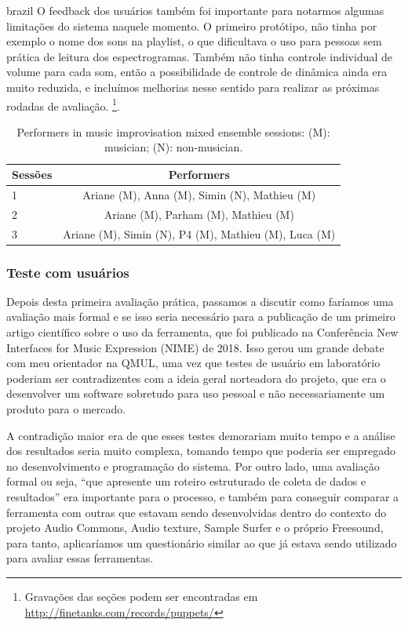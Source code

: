 \begin{otherlanguage*}{brazil}
O feedback dos usuários também foi importante para notarmos algumas limitações do sistema naquele momento. O primeiro protótipo, não tinha por exemplo o nome dos sons na playlist, o que dificultava o uso para pessoas sem prática de leitura dos espectrogramas. Também não tinha controle individual de volume para cada som, então a possibilidade de controle de dinâmica ainda era muito reduzida, e incluímos melhorias nesse sentido para realizar as próximas rodadas de avaliação.   \footnote{Gravações das seções podem ser encontradas em \url{http://finetanks.com/records/puppets/}}.

\begin{table}
\centering
\caption{Performers in music improvisation mixed ensemble sessions: (M): musician; (N): non-musician.}
\begin{tabular}{|lc|} \hline
Sessões & Performers \\ \hline
1 & Ariane (M), Anna (M), Simin (N), Mathieu (M)\\ \hline
2 & Ariane (M), Parham (M), Mathieu (M) \\ \hline
3 & Ariane (M), Simin (N), P4 (M), Mathieu (M), Luca (M)\\
\hline\end{tabular}
\label{tab:puppets}
\end{table}

\subsubsection{Teste com usuários}

Depois desta primeira avaliação prática, passamos a discutir como faríamos uma avaliação mais formal e se isso seria necessário para a publicação de um primeiro artigo científico sobre o uso da ferramenta, que foi publicado na Conferência New Interfaces for Music Expression (NIME) de 2018. Isso gerou um grande debate com meu orientador na QMUL, uma vez que testes de usuário em laboratório poderiam ser contradizentes com a ideia geral norteadora do projeto, que era o desenvolver um software sobretudo para uso pessoal e não necessariamente um produto para o mercado. 


A contradição maior era de que esses testes demorariam muito tempo e a análise dos resultados seria muito complexa, tomando tempo que poderia ser empregado no desenvolvimento e programação do sistema. Por outro lado, uma avaliação formal ou seja, ``que apresente um roteiro estruturado de coleta de dados e resultados'' \cite{Stowell} era importante para o processo, e também para conseguir comparar a ferramenta com outras que estavam sendo desenvolvidas dentro do contexto do projeto Audio Commons, Audio texture, Sample Surfer e o próprio Freesound, para tanto, aplicaríamos um questionário similar ao que já estava sendo utilizado para avaliar essas ferramentas.



\end{otherlanguage*}
